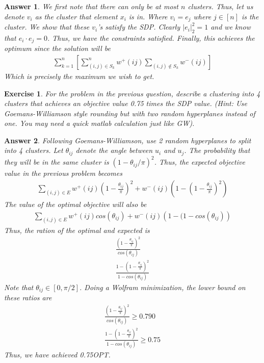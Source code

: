 \documentclass[12pt]{article}
\theoremstyle{colon}
\newtheorem{exercise}{Exercise}
\newtheorem*{answer}{Answer}
\begin{document}
\begin{answer}
  We first note that there can only be at most $n$ clusters. Thus, let us denote $v_i$ as the cluster that element $x_i$ is in. Where $v_i = e_j$ where $j \in [n]$ is the cluster. We show that these $v_i$'s satisfy the SDP. Clearly $\lvert e_i \rvert_2^2 = 1$ and we know that $e_i \cdot e_j = 0$. Thus, we have the constraints satisfied. Finally, this achieves the optimum since the solution will be
  \begin{gather*}
    \sum_{k=1}^n \left[ \sum_{(i,j) \in S_k}^n w^+(ij) \sum_{(i,j) \notin S_k} w^-(ij) \right]
  \end{gather*}
  Which is precisely the maximum we wish to get.
\end{answer}

\clearpage

\begin{exercise}
  For the problem in the previous question, describe a clustering into 4 clusters that achieves an objective value 0.75 times the SDP value. (Hint: Use Goemans-Williamson style rounding but with two random hyperplanes instead of one. You may need a quick matlab calculation just like GW).
\end{exercise}

\begin{answer}
  Following Goemans-Williamson, use 2 random hyperplanes to split into 4 clusters. Let $\theta_{ij}$ denote the angle between $u_i$ and $u_j$. The probability that they will be in the same cluster is $(1 - \theta_{ij}/\pi)^2$. Thus, the expected objective value in the previous problem becomes
  \begin{gather*}
    \sum_{(i,j) \in E} w^+(ij) \left(1 - \frac{\theta_{ij}}{\pi} \right)^2 + w^-(ij) \left(1 - \left(1 - \frac{\theta_{ij}}{\pi} \right)^2 \right)
  \end{gather*}
  The value of the optimal objective will also be
  \begin{gather*}
    \sum_{(i,j) \in E} w^+(ij) cos(\theta_{ij}) + w^-(ij) \left(1 - (1 - cos(\theta_{ij}) \right)
  \end{gather*}
  Thus, the ration of the optimal and expected is
  \begin{gather*}
    \frac{\left(1 - \frac{\theta_{ij}}{\pi} \right)^2}{cos(\theta_{ij})} \\
    \frac{1 - \left(1 - \frac{\theta_{ij}}{\pi} \right)^2}{1 - cos(\theta_{ij})}
  \end{gather*}
  Note that $\theta_{ij} \in [0, \pi/2]$. Doing a Wolfram minimization, the lower bound on these ratios are
  \begin{gather*}
    \frac{\left(1 - \frac{\theta_{ij}}{\pi} \right)^2}{cos(\theta_{ij})} \geq 0.790 \\
    \frac{1 - \left(1 - \frac{\theta_{ij}}{\pi} \right)^2}{1 - cos(\theta_{ij})} \geq 0.75
  \end{gather*}
  Thus, we have achieved 0.75OPT.
\end{answer}
\end{document}
